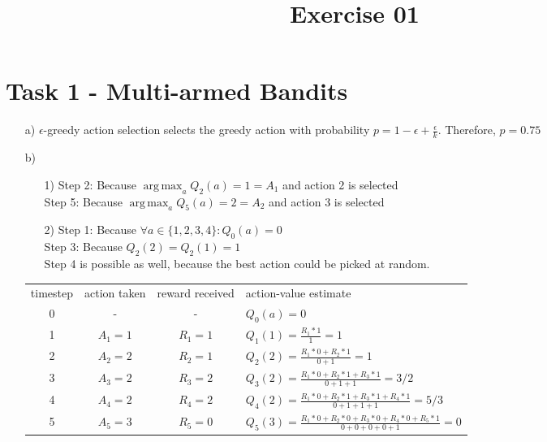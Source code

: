 \documentclass[a4paper]{article}
\date{}
\author{}
\title{\textbf{Exercise 01}}
\DeclareMathOperator*{\argmax}{arg\,max}
\begin{document}
	\maketitle 
	\thispagestyle{fancy}
	
    \section*{Task 1 - Multi-armed Bandits}
    \begin{itemize}
    \item[a)] $\epsilon$-greedy action selection selects the greedy action with probability $p=1-\epsilon + \frac{\epsilon}{k}$. Therefore, $p=0.75$
    \item[b)]
    	\begin{itemize}
    		\item[1)] Step 2: Because $\argmax_a Q_2(a) = 1 = A_1$ and action 2 is selected \\
    				  Step 5: Because $\argmax_a Q_5(a) = 2 = A_2$ and action 3 is selected \\
    		\item[2)] Step 1: Because $\forall a \in \{1,2,3,4\}: Q_0(a) = 0$ \\
    				  Step 3: Because $Q_2(2)=Q_2(1)=1$ \\
    				  Step 4 is possible as well, because the best action could be picked at random.
    	\end{itemize}
    \vspace{.3in}
    \begin{tabularx}{\linewidth}{c | c | c | l}
    	timestep & action taken & reward received & action-value estimate \\ 
    	0 & - & -  & $Q_0(a) = 0$ \\[2ex]
    	1 & $A_1=1$ & $R_1=1$ & $Q_1(1) = \frac{R_1*1}{1} = 1$ \\[2ex]
    	2 & $A_2=2$ & $R_2=1$ & $Q_2(2) = \frac{R_1*0+R_2*1}{0+1} = 1$ \\[2ex]
    	3 & $A_3=2$ & $R_3=2$ & $Q_3(2) = \frac{R_1*0+R_2*1+R_3*1}{0+1+1} = 3/2$ \\[2ex]
    	4 & $A_4=2$ & $R_4=2$ & $Q_4(2) = \frac{R_1*0+R_2*1+R_3*1+R_4*1}{0+1+1+1} = 5/3$  \\[2ex]
    	5 & $A_5=3$ & $R_5=0$ & $Q_5(3) = \frac{R_1*0+R_2*0+R_3*0+R_4*0+R_5*1}{0+0+0+0+1} = 0$
    \end{tabularx}
    \end{itemize}

    
\end{document}
